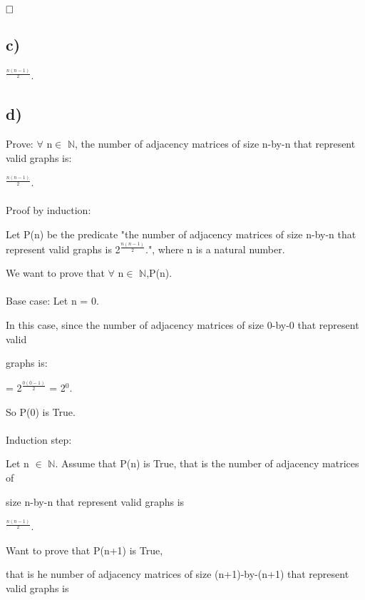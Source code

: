 \documentclass[12pt]{article}
\begin{document}
$\hfill\square$ 
\vspace{20pt}

\subsection*{c)}
\quad \quad \quad \quad \quad \quad \quad \quad \quad \quad \quad \quad \quad \quad \quad \quad \quad {}$^{\frac{n(n-1)}{2}}$.
\newpage
\subsection*{d)}
\vspace{20pt}
Prove:
$\forall$ n$\in$ $\mathbb{N}$, the number of adjacency matrices of size n-by-n that represent valid graphs is:

\quad \quad \quad \quad \quad \quad \quad \quad \quad \quad \quad \quad \quad \quad \quad \quad \quad {}$^{\frac{n(n-1)}{2}}$.\\
\\
Proof by induction: 

Let P(n) be the predicate "the number of adjacency matrices of size n-by-n that represent valid graphs is 2$^{\frac{n(n-1)}{2}}$.", where n is a natural number.

We want to prove that $\forall$ n$\in$ $\mathbb{N}$,P(n).\\
\\
Base case: Let n = 0. 

In this case, since the number of adjacency matrices of size 0-by-0 that represent valid 

graphs is:

\quad \quad \quad \quad \quad \quad \quad \quad \quad \quad \quad \quad \quad \quad \quad \quad \quad {} = 2$^{\frac{0(0-1)}{2}}$ = 2$^0$.

So P(0) is True.\\
\\
Induction step: 

Let n $\in$ $\mathbb{N}$. Assume that P(n) is True, that is the number of adjacency matrices of 

size n-by-n that represent valid graphs is 
 
\quad \quad \quad \quad \quad \quad \quad \quad \quad \quad \quad \quad \quad \quad \quad \quad \quad {}$^{\frac{n(n-1)}{2}}$.

Want to prove that P(n+1) is True,

 that is he number of adjacency matrices of size (n+1)-by-(n+1) that represent valid graphs is 
\end{document}
